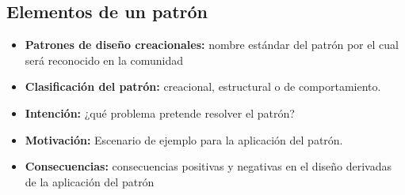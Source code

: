 \documentclass[twoside,twocolumn]{article}
\begin{document}
\subsection{ Elementos de un patrón}
\begin{itemize}
	\item \textbf{Patrones de diseño creacionales:} nombre estándar del patrón por el cual será reconocido en la comunidad \cite{Tanembaum1}
	\item \textbf{Clasificación del patrón:} creacional, estructural o de comportamiento.\cite{Tanembaum1}
	\item \textbf{Intención:} ¿qué problema pretende resolver el patrón?\cite{Tanembaum1}
	\item \textbf{Motivación:} Escenario de ejemplo para la aplicación del patrón.\cite{Tanembaum1}
	\item \textbf{Consecuencias:} consecuencias positivas y negativas en el diseño derivadas de la aplicación del patrón\cite{Tanembaum1}	
\end{itemize}
\end{document}
